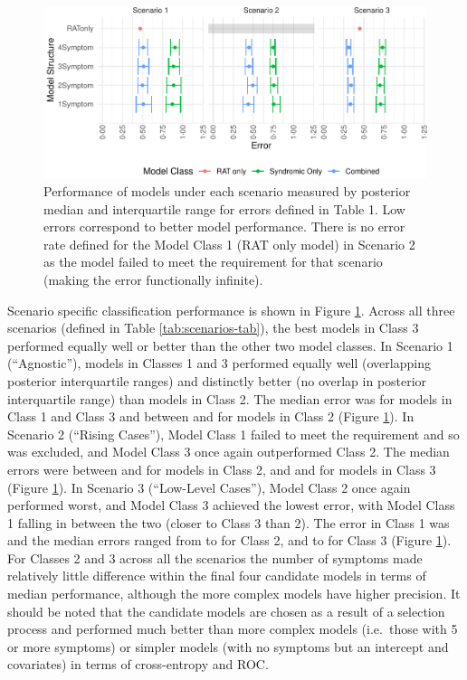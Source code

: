 \documentclass[]{elsarticle} %
\begin{document}
\begin{figure}
\includegraphics[width=1\linewidth]{0501_MainText_files/figure-latex/scenario-plot-1} \caption{Performance of models under each scenario measured by posterior median and interquartile range for errors defined in Table 1. Low errors correspond to better model performance. There is no error rate defined for the Model Class 1 (RAT only model) in Scenario 2 as the model failed to meet the requirement for that scenario (making the error functionally infinite).}\label{fig:scenario-plot}
\end{figure}

Scenario specific classification performance is shown in Figure \ref{fig:scenario-plot}.
Across all three scenarios (defined in Table \ref{tab:scenarios-tab}), the best models in Class 3 performed equally well or better than the other two model classes.
In Scenario 1 (``Agnostic''), models in Classes 1 and 3 performed equally well (overlapping posterior interquartile ranges) and distinctly better (no overlap in posterior interquartile range) than models in Class 2.
The median error was  for models in Class 1 and Class 3 and between  and  for models in Class 2 (Figure \ref{fig:scenario-plot}).
In Scenario 2 (``Rising Cases''), Model Class 1 failed to meet the requirement and so was excluded, and Model Class 3 once again outperformed Class 2.
The median errors were between  and  for models in Class 2, and  and  for models in Class 3 (Figure \ref{fig:scenario-plot}).
In Scenario 3 (``Low-Level Cases''), Model Class 2 once again performed worst, and Model Class 3 achieved the lowest error, with Model Class 1 falling in between the two (closer to Class 3 than 2).
The error in Class 1 was  and the median errors ranged from  to  for Class 2, and  to  for Class 3 (Figure \ref{fig:scenario-plot}).
For Classes 2 and 3 across all the scenarios the number of symptoms made relatively little difference within the final four candidate models in terms of median performance, although the more complex models have higher precision.
It should be noted that the candidate models are chosen as a result of a selection process and performed much better than more complex models (i.e.~those with 5 or more symptoms) or simpler models (with no symptoms but an intercept and covariates) in terms of cross-entropy and ROC.
\end{document}
